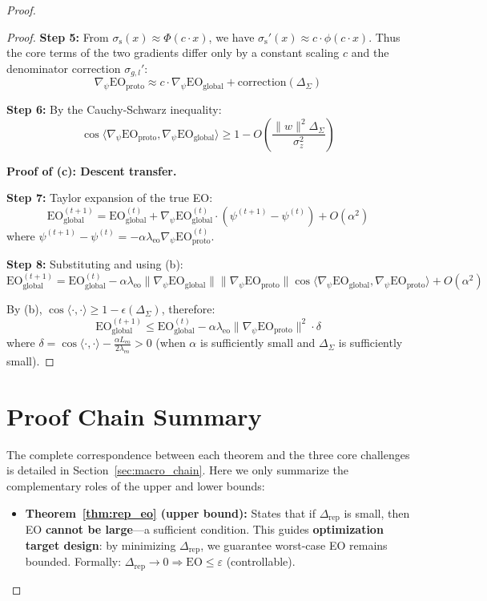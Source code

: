 \documentclass[11pt]{article}
\begin{document}
\begin{proof}
\begin{proof}
\textbf{Step 5:} From $\sigma_{\text{s}}(x) \approx \Phi(c \cdot x)$, we have $\sigma_{\text{s}}'(x) \approx c \cdot \phi(c \cdot x)$. Thus the core terms of the two gradients differ only by a constant scaling $c$ and the denominator correction $\sigma_{g,l}'$:
$$\nabla_\psi \mathrm{EO}_{\mathrm{proto}} \approx c \cdot \nabla_\psi \mathrm{EO}_{\mathrm{global}} + \text{correction}(\Delta_\Sigma)$$

\textbf{Step 6:} By the Cauchy-Schwarz inequality:
$$\cos\langle \nabla_\psi \mathrm{EO}_{\mathrm{proto}}, \nabla_\psi \mathrm{EO}_{\mathrm{global}} \rangle \geq 1 - O\left(\frac{\|w\|^2 \Delta_\Sigma}{\sigma_z^2}\right)$$

\textbf{Proof of (c): Descent transfer.}

\textbf{Step 7:} Taylor expansion of the true EO:
$$\mathrm{EO}_{\mathrm{global}}^{(t+1)} = \mathrm{EO}_{\mathrm{global}}^{(t)} + \nabla_\psi \mathrm{EO}_{\mathrm{global}}^{(t)} \cdot (\psi^{(t+1)} - \psi^{(t)}) + O(\alpha^2)$$
where $\psi^{(t+1)} - \psi^{(t)} = -\alpha \lambda_{\mathrm{eo}} \nabla_\psi \mathrm{EO}_{\mathrm{proto}}^{(t)}$.

\textbf{Step 8:} Substituting and using (b):
$$\mathrm{EO}_{\mathrm{global}}^{(t+1)} = \mathrm{EO}_{\mathrm{global}}^{(t)} - \alpha \lambda_{\mathrm{eo}} \|\nabla_\psi \mathrm{EO}_{\mathrm{global}}\| \|\nabla_\psi \mathrm{EO}_{\mathrm{proto}}\| \cos\langle \nabla_\psi \mathrm{EO}_{\mathrm{global}}, \nabla_\psi \mathrm{EO}_{\mathrm{proto}} \rangle + O(\alpha^2)$$

By (b), $\cos\langle \cdot, \cdot \rangle \geq 1 - \epsilon(\Delta_\Sigma)$, therefore:
$$\mathrm{EO}_{\mathrm{global}}^{(t+1)} \leq \mathrm{EO}_{\mathrm{global}}^{(t)} - \alpha \lambda_{\mathrm{eo}} \|\nabla_\psi \mathrm{EO}_{\mathrm{proto}}\|^2 \cdot \delta$$
where $\delta = \cos\langle \cdot, \cdot \rangle - \frac{\alpha L_{\mathrm{eo}}}{2\lambda_{\mathrm{eo}}} > 0$ (when $\alpha$ is sufficiently small and $\Delta_\Sigma$ is sufficiently small).
\end{proof}

\section{Proof Chain Summary}

The complete correspondence between each theorem and the three core challenges is detailed in Section~\ref{sec:macro_chain}. Here we only summarize the complementary roles of the upper and lower bounds:

\begin{itemize}
    \item \textbf{Theorem~\ref{thm:rep_eo} (upper bound):} States that if $\Delta_{\mathrm{rep}}$ is small, then EO \textbf{cannot be large}---a sufficient condition. This guides \textbf{optimization target design}: by minimizing $\Delta_{\mathrm{rep}}$, we guarantee worst-case EO remains bounded. Formally: $\Delta_{\mathrm{rep}} \to 0 \Rightarrow \mathrm{EO} \leq \varepsilon$ (controllable).


\end{itemize}
\end{proof}
\end{document}
